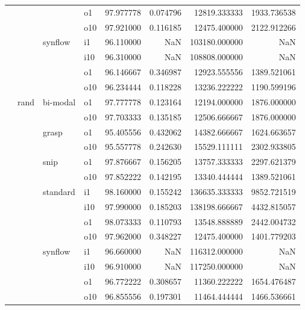 \begin{longtable}{llllrrrr}
      &     &         & o1 &  97.977778 &   0.074796 &     12819.333333 &   1933.736538 \\
      &     &         & o10 &  97.921000 &   0.116185 &     12475.400000 &   2122.912266 \\
      &     & synflow & i1 &  96.110000 &        NaN &    103180.000000 &           NaN \\
      &     &         & i10 &  96.310000 &        NaN &    108808.000000 &           NaN \\
      &     &         & o1 &  96.146667 &   0.346987 &     12923.555556 &   1389.521061 \\
      &     &         & o10 &  96.234444 &   0.118228 &     13236.222222 &   1190.599196 \\
      & rand & bi-modal & o1 &  97.777778 &   0.123164 &     12194.000000 &   1876.000000 \\
      &     &         & o10 &  97.703333 &   0.135185 &     12506.666667 &   1876.000000 \\
      &     & grasp & o1 &  95.405556 &   0.432062 &     14382.666667 &   1624.663657 \\
      &     &         & o10 &  95.557778 &   0.242630 &     15529.111111 &   2302.933805 \\
      &     & snip & o1 &  97.876667 &   0.156205 &     13757.333333 &   2297.621379 \\
      &     &         & o10 &  97.852222 &   0.142195 &     13340.444444 &   1389.521061 \\
      &     & standard & i1 &  98.160000 &   0.155242 &    136635.333333 &   9852.721519 \\
      &     &         & i10 &  97.990000 &   0.185203 &    138198.666667 &   4432.815057 \\
      &     &         & o1 &  98.073333 &   0.110793 &     13548.888889 &   2442.004732 \\
      &     &         & o10 &  97.962000 &   0.348227 &     12475.400000 &   1401.779203 \\
      &     & synflow & i1 &  96.660000 &        NaN &    116312.000000 &           NaN \\
      &     &         & i10 &  96.910000 &        NaN &    117250.000000 &           NaN \\
      &     &         & o1 &  96.772222 &   0.308657 &     11360.222222 &   1654.476487 \\
      &     &         & o10 &  96.855556 &   0.197301 &     11464.444444 &   1466.536661 \\

\end{longtable}
